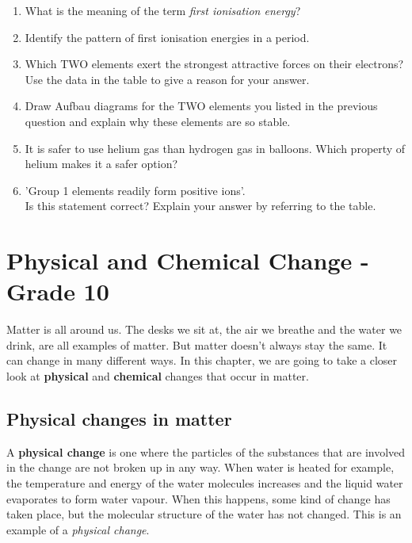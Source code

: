 {\begin{enumerate}
{{	\begin{enumerate} 
	\item What is the meaning of the term \textit{first ionisation energy}? 
	\item Identify the pattern of first ionisation energies in a period. 
	\item Which TWO elements exert the strongest attractive forces on their electrons? Use the data in the table to give a reason for your answer. 
	\item Draw Aufbau diagrams for the TWO elements you listed in the previous question and explain why these elements are so stable. 
	\item It is safer to use helium gas than hydrogen gas in balloons. Which property of helium makes it a safer option? 
	\item 'Group 1 elements readily form positive ions'.\\ Is this statement correct? Explain your answer by referring to the table. 
	\end{enumerate} 
}

}
\end{enumerate}
}

\chapter{Physical and Chemical Change - Grade 10}
\label{chap:physchem}

Matter is all around us. The desks we sit at, the air we breathe and the water we drink, are all examples of matter. But matter doesn't always stay the same. It can change in many different ways. In this chapter, we are going to take a closer look at \textbf{physical} and \textbf{chemical} changes that occur in matter.



\section{Physical changes in matter}
\label{sec:physchem:phys}

A \textbf{physical change} is one where the particles of the substances that are involved in the change are not broken up in any way.  When water is heated for example, the temperature and energy of the water molecules increases and the liquid water evaporates to form water vapour. When this happens, some kind of change has taken place, but the molecular structure of the water has not changed. This is an example of a \textit{physical change}. 

